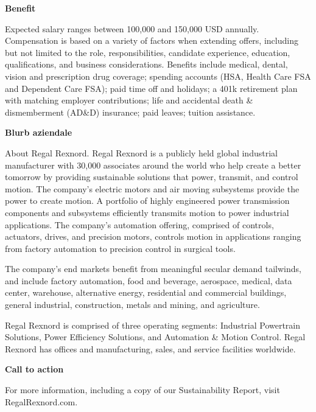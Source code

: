 \noindent\textbf{\textcolor{benefitColor}{Benefit}}\par
\noindent Expected salary ranges between 100,000 and 150,000 USD annually. Compensation is based on a variety of factors when extending offers, including but not limited to the role, responsibilities, candidate experience, education, qualifications, and business considerations. Benefits include medical, dental, vision and prescription drug coverage; spending accounts (HSA, Health Care FSA and Dependent Care FSA); paid time off and holidays; a 401k retirement plan with matching employer contributions; life and accidental death \& dismemberment (AD\&D) insurance; paid leaves; tuition assistance.\par
\noindent{\color{benefitColor}\rule{\textwidth}{0.6pt}}\par\medskip

\noindent\textbf{\textcolor{companyBlurbColor}{Blurb aziendale}}\par
\noindent About Regal Rexnord. Regal Rexnord is a publicly held global industrial manufacturer with 30,000 associates around the world who help create a better tomorrow by providing sustainable solutions that power, transmit, and control motion. The company's electric motors and air moving subsystems provide the power to create motion. A portfolio of highly engineered power transmission components and subsystems efficiently transmits motion to power industrial applications. The company's automation offering, comprised of controls, actuators, drives, and precision motors, controls motion in applications ranging from factory automation to precision control in surgical tools.\par\smallskip
\noindent The company's end markets benefit from meaningful secular demand tailwinds, and include factory automation, food and beverage, aerospace, medical, data center, warehouse, alternative energy, residential and commercial buildings, general industrial, construction, metals and mining, and agriculture.\par\smallskip
\noindent Regal Rexnord is comprised of three operating segments: Industrial Powertrain Solutions, Power Efficiency Solutions, and Automation \& Motion Control. Regal Rexnord has offices and manufacturing, sales, and service facilities worldwide.\par
\noindent{\color{companyBlurbColor}\rule{\textwidth}{0.6pt}}\par\medskip

\noindent\textbf{\textcolor{callToActionColor}{Call to action}}\par
\noindent For more information, including a copy of our Sustainability Report, visit RegalRexnord.com.\par
\noindent{\color{callToActionColor}\rule{\textwidth}{0.6pt}}\par\medskip


